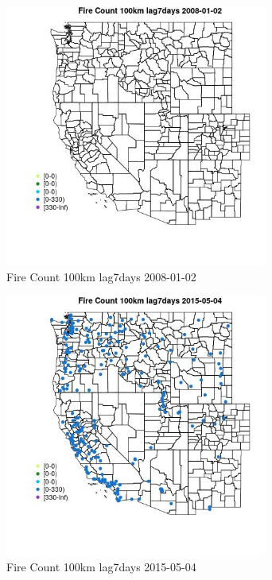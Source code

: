\begin{figure} 
\centering  
\includegraphics[width=0.77\textwidth]{Code_Outputs/Report_ML_input_PM25_Step4_part_e_de_duplicated_aves_compiled_2019-05-18wNAs_MapObsFire_Count_100km_lag7days2008-01-02.jpg} 
\caption{\label{fig:Report_ML_input_PM25_Step4_part_e_de_duplicated_aves_compiled_2019-05-18wNAsMapObsFire_Count_100km_lag7days2008-01-02}Fire Count 100km lag7days 2008-01-02} 
\end{figure} 
 

\clearpage 

\begin{figure} 
\centering  
\includegraphics[width=0.77\textwidth]{Code_Outputs/Report_ML_input_PM25_Step4_part_e_de_duplicated_aves_compiled_2019-05-18wNAs_MapObsFire_Count_100km_lag7days2015-05-04.jpg} 
\caption{\label{fig:Report_ML_input_PM25_Step4_part_e_de_duplicated_aves_compiled_2019-05-18wNAsMapObsFire_Count_100km_lag7days2015-05-04}Fire Count 100km lag7days 2015-05-04} 
\end{figure} 
 

